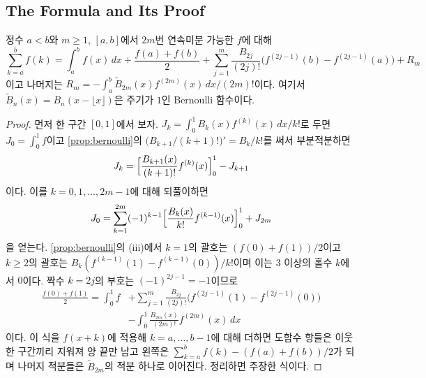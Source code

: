 \subsection{The Formula and Its Proof}

\begin{theorem}
\label{thm:euler-maclaurin}
정수 $a<b$와 $m\ge1$, $[a,b]$에서 $2m$번 연속미분 가능한 $f$에 대해
\[
\sum_{k=a}^{b}f(k)=\int_a^bf(x)\,dx+\frac{f(a)+f(b)}{2}+\sum_{j=1}^m\frac{B_{2j}}{(2j)!}\bigl(f^{(2j-1)}(b)-f^{(2j-1)}(a)\bigr)+R_m
\]
이고 나머지는 $R_m=-\int_a^b\widetilde B_{2m}(x)f^{(2m)}(x)\,dx/(2m)!$이다. 여기서 $\widetilde B_n(x)=B_n(x-\lfloor x\rfloor)$은 주기가 $1$인 Bernoulli 함수이다.
\end{theorem}

\begin{proof}
먼저 한 구간 $[0,1]$에서 보자. $J_k=\int_0^1B_k(x)f^{(k)}(x)\,dx/k!$로 두면 $J_0=\int_0^1f$이고 \cref{prop:bernoulli}의 $\bigl(B_{k+1}/(k+1)!\bigr)'=B_k/k!$를 써서 부분적분하면
\[
J_k=\Bigl[\frac{B_{k+1}(x)}{(k+1)!}f^{(k)}(x)\Bigr]_0^1-J_{k+1}
\]
이다. 이를 $k=0,1,\dots,2m-1$에 대해 되풀이하면
\[
J_0=\sum_{k=1}^{2m}(-1)^{k-1}\Bigl[\frac{B_k(x)}{k!}f^{(k-1)}(x)\Bigr]_0^1+J_{2m}
\]
을 얻는다. \cref{prop:bernoulli}의 (iii)에서 $k=1$의 괄호는 $(f(0)+f(1))/2$이고 $k\ge2$의 괄호는 $B_k(f^{(k-1)}(1)-f^{(k-1)}(0))/k!$이며 이는 $3$ 이상의 홀수 $k$에서 $0$이다. 짝수 $k=2j$의 부호는 $(-1)^{2j-1}=-1$이므로
\begin{align*}
\frac{f(0)+f(1)}{2}=\int_0^1f&+\sum_{j=1}^m\frac{B_{2j}}{(2j)!}\bigl(f^{(2j-1)}(1)-f^{(2j-1)}(0)\bigr)\\
&-\int_0^1\frac{B_{2m}(x)}{(2m)!}f^{(2m)}(x)\,dx
\end{align*}
이다. 이 식을 $f(x+k)$에 적용해 $k=a,\dots,b-1$에 대해 더하면 도함수 항들은 이웃한 구간끼리 지워져 양 끝만 남고 왼쪽은 $\sum_{k=a}^bf(k)-(f(a)+f(b))/2$가 되며 나머지 적분들은 $\widetilde B_{2m}$의 적분 하나로 이어진다. 정리하면 주장한 식이다.
\end{proof}

